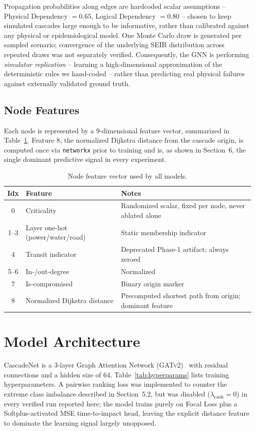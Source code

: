 \documentclass[10pt]{article}
\begin{document}
Propagation probabilities along edges are hardcoded scalar assumptions -- Physical Dependency $=0.65$, Logical Dependency $=0.80$ -- chosen to keep simulated cascades large enough to be informative, rather than calibrated against any physical or epidemiological model. One Monte Carlo draw is generated per sampled scenario; convergence of the underlying SEIR distribution across repeated draws was not separately verified. Consequently, the GNN is performing \emph{simulator replication} -- learning a high-dimensional approximation of the deterministic rules we hand-coded -- rather than predicting real physical failures against externally validated ground truth.

\subsection{Node Features}
Each node is represented by a 9-dimensional feature vector, summarized in Table~\ref{tab:features}. Feature 8, the normalized Dijkstra distance from the cascade origin, is computed once via \texttt{networkx} prior to training and is, as shown in Section~6, the single dominant predictive signal in every experiment.

\begin{table}[ht]
\centering
\small
\caption{Node feature vector used by all models.}
\label{tab:features}
\begin{tabular}{@{}cll@{}}
\toprule
\textbf{Idx} & \textbf{Feature} & \textbf{Notes} \\ \midrule
0 & Criticality & Randomized scalar, fixed per node, never ablated alone \\
1--3 & Layer one-hot (power/water/road) & Static membership indicator \\
4 & Transit indicator & Deprecated Phase-1 artifact; always zeroed \\
5--6 & In-/out-degree & Normalized \\
7 & Is-compromised & Binary origin marker \\
8 & Normalized Dijkstra distance & Precomputed shortest path from origin; dominant feature \\ \bottomrule
\end{tabular}
\end{table}

\section{Model Architecture}
CascadeNet is a 3-layer Graph Attention Network (GATv2)~\cite{brody2022how} with residual connections and a hidden size of 64. Table~\ref{tab:hyperparams} lists training hyperparameters. A pairwise ranking loss was implemented to counter the extreme class imbalance described in Section~5.2, but was disabled ($\lambda_{\text{rank}}=0$) in every verified run reported here; the model trains purely on Focal Loss plus a Softplus-activated MSE time-to-impact head, leaving the explicit distance feature to dominate the learning signal largely unopposed.
\end{document}

